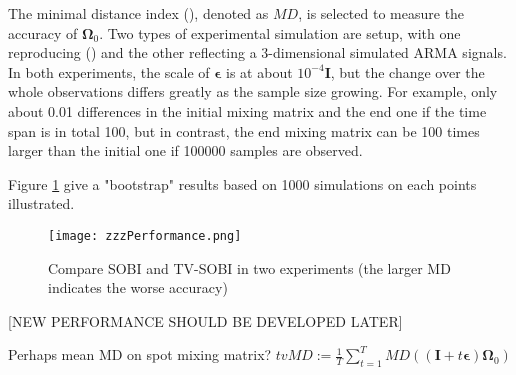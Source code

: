 \documentclass[utf8,english]{gradu3}
\begin{document}
The minimal distance index (\cite{ilmonen2010new}), denoted as $MD$, is selected to measure the accuracy of $\boldsymbol{\Omega}_0$. Two types of experimental simulation are setup, with one reproducing \citeauthor{yeredor2003tv} (\citeyear{yeredor2003tv}) and the other reflecting a 3-dimensional simulated ARMA signals. In both experiments, the scale of $\boldsymbol\epsilon$ is at about $10^{-4}\boldsymbol{I}$, but the change over the whole observations differs greatly as the sample size growing. For example, only about 0.01 differences in the initial mixing matrix and the end one if the time span is in total 100, but in contrast, the end mixing matrix can be 100 times larger than the initial one if 100000 samples are observed.

Figure \ref{fig: performance} give a "bootstrap" results based on 1000 simulations on each points illustrated. 

\begin{figure}
  \texttt{[image: zzzPerformance.png]}
  \caption{Compare SOBI and TV-SOBI in two experiments (the larger MD indicates the worse accuracy)}
  \label{fig: performance}
\end{figure}

[NEW PERFORMANCE SHOULD BE DEVELOPED LATER]

Perhaps mean MD on spot mixing matrix? $tvMD := \frac 1 T \sum\limits_{t=1}^T MD((\boldsymbol{I} + t\boldsymbol\epsilon)\boldsymbol\Omega_0)$


\printbibliography
\end{document}
